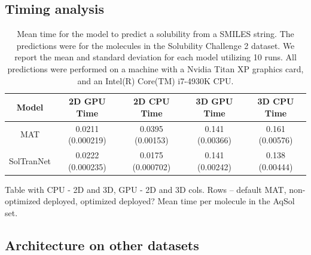 \documentclass[journal=jmcmar,manuscript=article]{achemso}
\begin{document}
\subsection{Timing analysis}

\begin{table}
    \begin{tabular}{|c|c|c|c|c|}
        \hline
         Model & 2D GPU Time & 2D CPU Time & 3D GPU Time & 3D CPU Time \\
         \hline
         MAT & 0.0211 (0.000219) & 0.0395 (0.00153) & 0.141 (0.00366) & 0.161 (0.00576) \\
         SolTranNet & 0.0222 (0.000235) & 0.0175 (0.000702) & 0.141 (0.00242) & 0.138 (0.00444) \\
         \hline
    \end{tabular}
    \caption{Mean time for the model to predict a solubility from a SMILES string. The predictions were for the molecules in the Solubility Challenge 2 dataset. We report the mean and standard deviation for each model utilizing 10 runs. All predictions were performed on a machine with a Nvidia Titan XP graphics card, and an Intel(R) Core(TM) i7-4930K CPU.}
    \label{tab:timings}
\end{table}

Table with CPU - 2D and 3D, GPU - 2D and 3D cols. Rows -- default MAT, non-optimized deployed, optimized deployed?
Mean time per molecule in the AqSol set.

\subsection{Architecture on other datasets}
\end{document}
